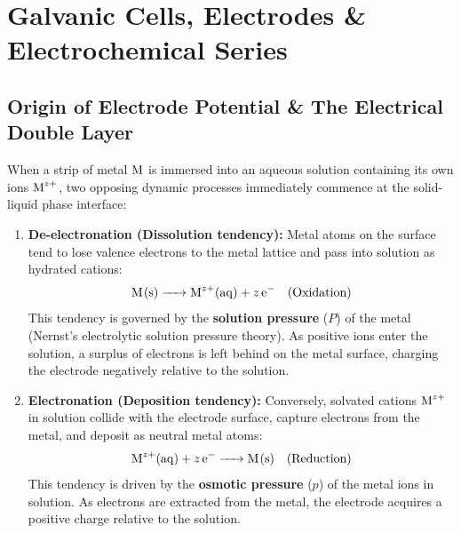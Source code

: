 \chapter{Galvanic Cells, Electrodes \& Electrochemical Series}
\label{chap:galvanic_cells}

\section{Origin of Electrode Potential \& The Electrical Double Layer}

When a strip of metal $\ce{M}$ is immersed into an aqueous solution containing its own ions $\ce{M^{z+}}$, two opposing dynamic processes immediately commence at the solid-liquid phase interface:

\begin{enumerate}[leftmargin=*]
    \item \textbf{De-electronation (Dissolution tendency):}
    Metal atoms on the surface tend to lose valence electrons to the metal lattice and pass into solution as hydrated cations:
    \begin{equation}
        \ce{M(s) -> M^{z+}(aq) + z e^-} \quad (\text{Oxidation})
    \end{equation}
    This tendency is governed by the \textbf{solution pressure} ($P$) of the metal (Nernst's electrolytic solution pressure theory). As positive ions enter the solution, a surplus of electrons is left behind on the metal surface, charging the electrode negatively relative to the solution.

    \item \textbf{Electronation (Deposition tendency):}
    Conversely, solvated cations $\ce{M^{z+}}$ in solution collide with the electrode surface, capture electrons from the metal, and deposit as neutral metal atoms:
    \begin{equation}
        \ce{M^{z+}(aq) + z e^- -> M(s)} \quad (\text{Reduction})
    \end{equation}
    This tendency is driven by the \textbf{osmotic pressure} ($p$) of the metal ions in solution. As electrons are extracted from the metal, the electrode acquires a positive charge relative to the solution.
\end{enumerate}


